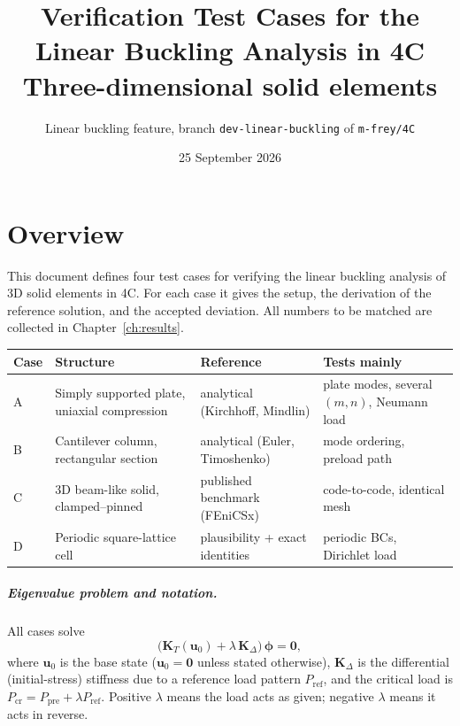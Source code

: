 \documentclass[11pt,a4paper]{report}
\title{\textbf{Verification Test Cases for the\\Linear Buckling Analysis in 4C}\\[0.5em]
\large Three-dimensional solid elements}
\author{Linear buckling feature, branch \texttt{dev-linear-buckling} of \texttt{m-frey/4C}}
\date{25 September 2026}
\newcommand{\bu}{\bm{u}}
\newcommand{\KT}{\mathbf{K}_T}
\newcommand{\KD}{\mathbf{K}_\Delta}
\begin{document}
\maketitle
\tableofcontents

\chapter*{Overview}

This document defines four test cases for verifying the linear buckling
analysis of 3D solid elements in 4C. For each case it gives the setup,
the derivation of the reference solution, and the accepted deviation.
All numbers to be matched are collected in Chapter~\ref{ch:results}.

\begin{center}
\begin{tabularx}{\textwidth}{@{}l>{\raggedright}X>{\raggedright}X>{\raggedright\arraybackslash}X@{}}
\toprule
Case & Structure & Reference & Tests mainly \\
\midrule
A & Simply supported plate, uniaxial compression & analytical (Kirchhoff, Mindlin) & plate modes, several $(m,n)$, Neumann load \\
B & Cantilever column, rectangular section & analytical (Euler, Timoshenko) & mode ordering, preload path \\
C & 3D beam-like solid, clamped--pinned & published benchmark (FEniCSx) & code-to-code, identical mesh \\
D & Periodic square-lattice cell & plausibility + exact identities & periodic BCs, Dirichlet load \\
\bottomrule
\end{tabularx}
\end{center}

\paragraph{Eigenvalue problem and notation.}
All cases solve
\begin{equation}
  \bigl(\KT(\bu_0) + \lambda\,\KD\bigr)\,\bm{\phi} = \bm{0},
  \label{eq:evp}
\end{equation}
where $\bu_0$ is the base state ($\bu_0=\bm{0}$ unless stated otherwise),
$\KD$ is the differential (initial-stress) stiffness due to a reference load
pattern $P_\text{ref}$, and the critical load is $P_\text{cr} = P_\text{pre} +
\lambda P_\text{ref}$. Positive $\lambda$ means the load acts as given; negative
$\lambda$ means it acts in reverse.
\end{document}
